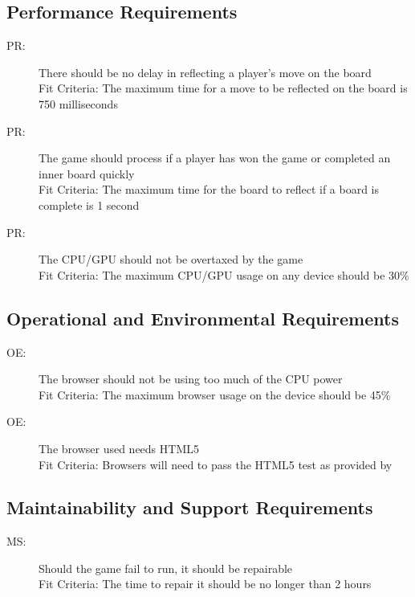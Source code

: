 \documentclass[12pt, titlepage]{article}
\newcounter{perreq}
\newcommand{\pertheperreq}{PR\theperreq}
\newcounter{oereq}
\newcommand{\oetheoereq}{OE\theoereq}
\newcounter{msreq}
\newcommand{\msthemsreq}{MS\themsreq}
\begin{document}
\subsection{Performance Requirements}
\begin{description}
\item [ \pertheperreq:] There should be no delay in reflecting a player's move on the board\\ Fit Criteria: The maximum time for a move to be reflected on the board is 750 milliseconds
\item [ \pertheperreq:] The game should process if a player has won the game or completed an inner board quickly\\
Fit Criteria: The maximum time for the board to reflect if a board is complete is 1 second
\item [ \pertheperreq:] The CPU/GPU should not be overtaxed by the game\\
Fit Criteria: The maximum CPU/GPU usage on any device should be 30\%
\end{description}

\subsection{Operational and Environmental Requirements}
\begin{description}
\item [ \oetheoereq:] The browser should not be using too much of the CPU power\\
Fit Criteria: The maximum browser usage on the device should be 45\%
\item [ \oetheoereq:] The browser used needs HTML5\\
Fit Criteria: Browsers will need to pass the HTML5 test as provided by ~\citep{htmlTest}
\end{description}

\subsection{Maintainability and Support Requirements}
\begin{description}
\item [ \msthemsreq:] Should the game fail to run, it should be repairable\\
Fit Criteria: The time to repair it should be no longer than 2 hours

\end{description}
\end{document}
